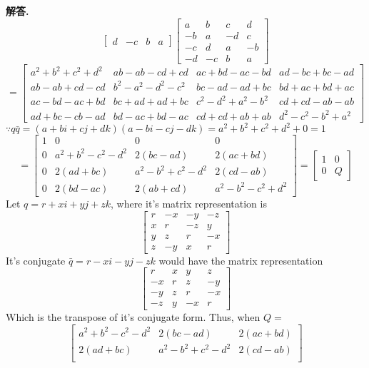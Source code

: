 \documentclass[12pt, a4paper, oneside]{article}
\newenvironment{solution}{\par\noindent\textbf{解答. }}{\par}
\begin{document}
\begin{CJK}{UTF8}{gbsn}
\begin{solution}
$$\begin{bmatrix}
    d & -c & b & a
  \end{bmatrix} \begin{bmatrix}
    a & b & c & d \\
    -b & a & -d & c \\ 
    -c & d & a & -b \\
    -d & -c & b & a
  \end{bmatrix} $$ 
   $$ = \begin{bmatrix}
    a^2+b^2+c^2+d^2 & ab-ab-cd+cd &ac+bd-ac-bd&ad-bc+bc-ad \\
    ab-ab+cd-cd & b^2-a^2-d^2-c^2 &bc-ad-ad+bc&bd+ac+bd+ac \\
    ac-bd-ac+bd&bc+ad+ad+bc&c^2-d^2+a^2-b^2&cd+cd-ab-ab \\
    ad+bc-cb-ad&bd-ac+bd-ac&cd+cd+ab+ab&d^2-c^2-b^2+a^2
  \end{bmatrix}$$ 
  $\because q\bar{q} = (a+bi+cj+dk)(a-bi-cj-dk) = a^2 + b^2 + c^2 + d^2 + 0 = 1 $ 
  $$ = \begin{bmatrix}
    1 & 0 & 0 & 0 \\
    0 & a^2+b^2-c^2-d^2 & 2(bc-ad) &2(ac+bd) \\
    0 & 2(ad+bc) & a^2-b^2+c^2-d^2 & 2(cd-ab) \\
    0 & 2(bd-ac) & 2(ab+cd) & a^2-b^2-c^2+d^2
  \end{bmatrix} = \begin{bmatrix}
    1 & 0 \\ 
    0 & Q
  \end{bmatrix}
  $$
  Let $q=r+xi+yj+zk$, where it's matrix representation is $$
  \begin{bmatrix}
    r & -x & -y & -z \\ 
    x & r & -z & y \\
    y & z & r & -x \\
    z & -y & x & r
  \end{bmatrix}$$ It's conjugate $\bar{q}=r-xi-yj-zk$ would have the matrix representation $$
  \begin{bmatrix}
    r & x & y & z \\ 
    -x & r & z & -y \\
    -y & z & r & -x \\
    -z & y & -x & r
  \end{bmatrix}
  $$
  Which is the transpose of it's conjugate form. Thus, when $Q=$ $$
  \begin{bmatrix}
    a^2+b^2-c^2-d^2 & 2(bc-ad) &2(ac+bd) \\
    2(ad+bc) & a^2-b^2+c^2-d^2 & 2(cd-ab) \\

\end{bmatrix}$$
\end{solution}
\end{CJK}
\end{document}
